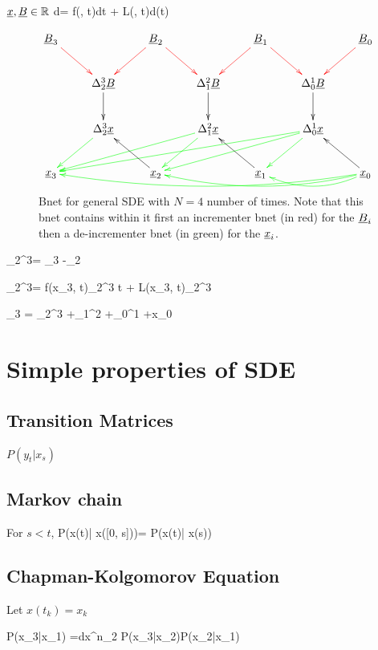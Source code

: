 ${\underline{x}}, {\underline{B}}\in { \mathbb{R}}$
\beq
d\rvx= f(\rvx, t)dt + L(\rvx, t)d\rvB(t)
\eeq

\begin{figure}
$$
\xymatrix{
\rvB_3\ar@[red][dr] 
&& \rvB_2\ar@[red][dl]\ar@[red][dr]
&& \rvB_1\ar@[red][dl]\ar@[red][dr]
&& \rvB_0\ar@[red][dl]
\\
&\Delta^3_2\rvB \ar[d]
&&\Delta^2_1 \rvB \ar[d]
&&\Delta^1_0 \rvB \ar[d]
&
\\
&\Delta^3_2\rvx \ar@[green][dl] 
&&\Delta^2_1 \rvx \ar@[green][dlll]\ar@[green][dl]
&&\Delta^1_0\rvx \ar@[green][dlllll]\ar@[green][dlll]\ar@[green][dl]
&
\\
\rvx_3 
&& \rvx_2 \ar[lu] 
&& \rvx_1 \ar[lu]
&& \rvx_0\ar[lu]
\ar@[green]@[green]@/^1pc/[ll]
\ar@[green]@/^1pc/[llll]
\ar@[green]@/^1pc/[llllll]
}
$$
\caption{Bnet for general SDE with $N=4$ number of times. Note that this bnet
contains within it first an incrementer bnet
(in red) for the ${\underline{B}}_i$
then a de-incrementer bnet (in green)
for the ${\underline{x}}_i$.}
\label{fig-sde-3-nodes}
\end{figure}


\beq
\color{blue}
\Delta_{2}^{3}\rvB = 
\rvB_3 -\rvB_2
\eeq

\beq
\color{blue}
\Delta_{2}^{3}\rvx = 
f(x_3, t)\Delta_2^3 t +
L(x_3, t)\Delta_{2}^{3}\rvB
\eeq

\beq\color{blue}
\rvx_3 = \Delta_{2}^{3}\rvx
+\Delta_{1}^{2}\rvx
+\Delta_{0}^{1}\rvx
+x_0
\eeq

\section{Simple properties of SDE}

\subsection {Transition Matrices}

$P(y_t|x_s)$

\subsection{Markov chain}

For $s<t$, 
\beq
P(x(t)| x([0, s]))=
P(x(t)| x(s))
\eeq
\subsection{Chapman-Kolgomorov Equation}
Let $x(t_k) = x_k$

\beq
P(x_3|x_1) =\int dx^n_2\; P(x_3|x_2)P(x_2|x_1)
\eeq

